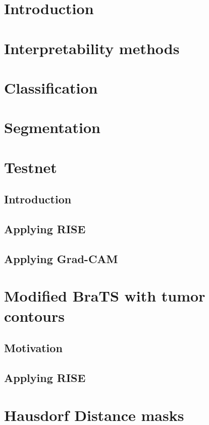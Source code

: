 \chapter{Introduction}


\chapter{Interpretability methods}


\chapter{Classification}


\chapter{Segmentation}


\chapter{Testnet}
\section{Introduction}
\section{Applying RISE}
\section{Applying Grad-CAM}

\chapter{Modified BraTS with tumor contours}
\section{Motivation}
\section{Applying RISE}

\chapter{Hausdorf Distance masks}
